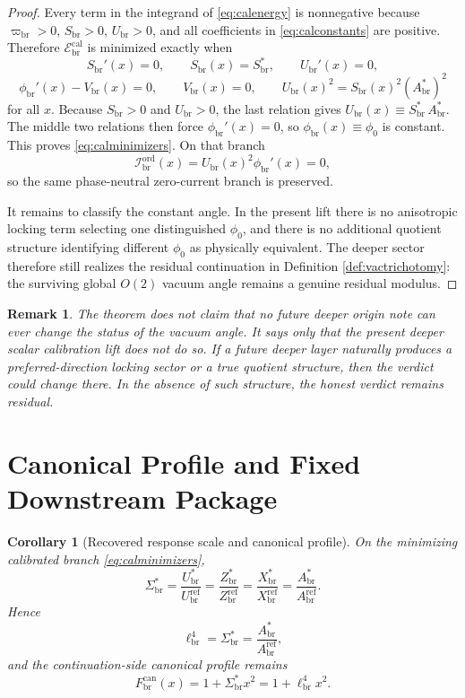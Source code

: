 \documentclass[11pt]{article}
\newcommand{\CurvScale}{\ell_{\mathrm{br}}}
\newcommand{\CurvProfileCan}{F_{\mathrm{br}}^{\mathrm{can}}}
\newcommand{\ProfWeight}{\varpi_{\mathrm{br}}}
\newcommand{\RespSusEq}{\Sigma_{\mathrm{br}}^{\ast}}
\newcommand{\RespMicroEq}{X_{\mathrm{br}}^{\ast}}
\newcommand{\RespMicroRef}{X_{\mathrm{br}}^{\mathrm{ref}}}
\newcommand{\RespOrderRef}{Z_{\mathrm{br}}^{\mathrm{ref}}}
\newcommand{\RespOrderEq}{Z_{\mathrm{br}}^{\ast}}
\newcommand{\RespOrderCurrent}{\mathcal I_{\mathrm{br}}^{\mathrm{ord}}}
\newcommand{\RespVacAmp}{U_{\mathrm{br}}}
\newcommand{\RespVacRef}{U_{\mathrm{br}}^{\mathrm{ref}}}
\newcommand{\RespVacEq}{U_{\mathrm{br}}^{\ast}}
\newcommand{\RespVacPhase}{\phi_{\mathrm{br}}}
\newcommand{\RespVacCarrier}{V_{\mathrm{br}}}
\newcommand{\RespScaleField}{S_{\mathrm{br}}}
\newcommand{\RespScaleEq}{S_{\mathrm{br}}^{\ast}}
\newcommand{\RespScaleAmpRef}{A_{\mathrm{br}}^{\mathrm{ref}}}
\newcommand{\RespScaleAmpEq}{A_{\mathrm{br}}^{\ast}}
\newcommand{\RespScaleEnergy}{\mathscr E_{\mathrm{br}}^{\mathrm{cal}}}
\newtheorem{remark}{Remark}
\newtheorem{corollary}{Corollary}
\begin{document}
\begin{proof}
Every term in the integrand of \eqref{eq:calenergy} is nonnegative because \(\ProfWeight>0\), \(\RespScaleField>0\), \(\RespVacAmp>0\), and all coefficients in \eqref{eq:calconstants} are positive. Therefore \(\RespScaleEnergy\) is minimized exactly when
\[
\RespScaleField'(x)=0,
\qquad
\RespScaleField(x)=\RespScaleEq,
\qquad
\RespVacAmp'(x)=0,
\]
\[
\RespVacPhase'(x)-\RespVacCarrier(x)=0,
\qquad
\RespVacCarrier(x)=0,
\qquad
\RespVacAmp(x)^2=\RespScaleField(x)^2(\RespScaleAmpEq)^2
\]
for all \(x\). Because \(\RespScaleField>0\) and \(\RespVacAmp>0\), the last relation gives \(\RespVacAmp(x)\equiv \RespScaleEq\,\RespScaleAmpEq\). The middle two relations then force \(\RespVacPhase'(x)=0\), so \(\RespVacPhase(x)\equiv\phi_0\) is constant. This proves \eqref{eq:calminimizers}. On that branch
\[
\RespOrderCurrent(x)=\RespVacAmp(x)^2\RespVacPhase'(x)=0,
\]
so the same phase-neutral zero-current branch is preserved.

It remains to classify the constant angle. In the present lift there is no anisotropic locking term selecting one distinguished \(\phi_0\), and there is no additional quotient structure identifying different \(\phi_0\) as physically equivalent. The deeper sector therefore still realizes the residual continuation in Definition \ref{def:vactrichotomy}: the surviving global \(O(2)\) vacuum angle remains a genuine residual modulus.
\end{proof}

\begin{remark}
The theorem does not claim that no future deeper origin note can ever change the status of the vacuum angle. It says only that the present deeper scalar calibration lift does not do so. If a future deeper layer naturally produces a preferred-direction locking sector or a true quotient structure, then the verdict could change there. In the absence of such structure, the honest verdict remains residual.
\end{remark}

\section{Canonical Profile and Fixed Downstream Package}

\begin{corollary}[Recovered response scale and canonical profile]
\label{cor:profile}
On the minimizing calibrated branch \eqref{eq:calminimizers},
\begin{equation}
\RespSusEq
=
\frac{\RespVacEq}{\RespVacRef}
=
\frac{\RespOrderEq}{\RespOrderRef}
=
\frac{\RespMicroEq}{\RespMicroRef}
=
\frac{\RespScaleAmpEq}{\RespScaleAmpRef}.
\label{eq:sigmafromcal}
\end{equation}
Hence
\begin{equation}
\CurvScale^4=\RespSusEq=\frac{\RespScaleAmpEq}{\RespScaleAmpRef},
\label{eq:scalefromcal}
\end{equation}
and the continuation-side canonical profile remains
\begin{equation}
\CurvProfileCan(x)=1+\RespSusEq x^2=1+\CurvScale^4x^2.
\label{eq:canonicalprofile}
\end{equation}
\end{corollary}
\end{document}
